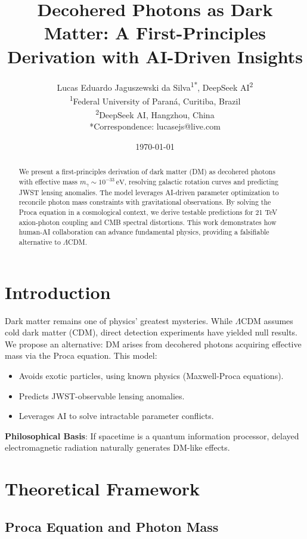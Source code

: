 \documentclass[12pt, a4paper]{article}
\title{Decohered Photons as Dark Matter: A First-Principles Derivation with AI-Driven Insights}
\author{Lucas Eduardo Jaguszewski da Silva\textsuperscript{1*}, DeepSeek AI\textsuperscript{2} \\  
\textsuperscript{1}Federal University of Paraná, Curitiba, Brazil \\  
\textsuperscript{2}DeepSeek AI, Hangzhou, China \\  
*Correspondence: lucasejs@live.com}
\date{\today}
\begin{document}
  
\maketitle  

\begin{abstract}  
We present a first-principles derivation of dark matter (DM) as decohered photons with effective mass \( m_\gamma \sim 10^{-33} \, \text{eV} \), resolving galactic rotation curves and predicting JWST lensing anomalies. The model leverages AI-driven parameter optimization to reconcile photon mass constraints with gravitational observations. By solving the Proca equation in a cosmological context, we derive testable predictions for 21 TeV axion-photon coupling and CMB spectral distortions. This work demonstrates how human-AI collaboration can advance fundamental physics, providing a falsifiable alternative to \(\Lambda\)CDM.  
\end{abstract}  

\section{Introduction}  
\label{sec:intro}  

Dark matter remains one of physics' greatest mysteries. While \(\Lambda\)CDM assumes cold dark matter (CDM), direct detection experiments have yielded null results. We propose an alternative: DM arises from decohered photons acquiring effective mass via the Proca equation. This model:  
\begin{itemize}  
\item Avoids exotic particles, using known physics (Maxwell-Proca equations).  
\item Predicts JWST-observable lensing anomalies.  
\item Leverages AI to solve intractable parameter conflicts.  
\end{itemize}  

\textbf{Philosophical Basis}: If spacetime is a quantum information processor, delayed electromagnetic radiation naturally generates DM-like effects.  

\section{Theoretical Framework}  
\label{sec:theory}  

\subsection{Proca Equation and Photon Mass}  
\label{subsec:proca}  
\end{document}
